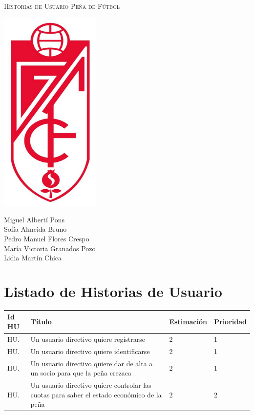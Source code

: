 \documentclass[11pt]{article}
\begin{document}
\begin{titlepage}
\centering
\vspace{4.5cm}
{\scshape\LARGE Historias de Usuario Peña de Fútbol\par}
\vspace{1.5cm}

\includegraphics[width=5cm]{escudoGR}

\vspace{3cm}
{\scshape\large \par}
\vspace{1cm}

{Miguel Albertí Pons\\
Sofía Almeida Bruno\\
Pedro Manuel Flores Crespo\\
María Victoria Granados Pozo\\
Lidia Martín Chica
\par}

\end{titlepage}
\newpage

\section{Listado de Historias de Usuario}
\begin{table}[H]
  \centering
  \begin{tabular}{p{0.1\linewidth}p{0.7\linewidth}p{0.15\linewidth}p{0.15\linewidth}}
    \toprule
    \textbf{Id HU} & \textbf{Título} & \textbf{Estimación} & \textbf{Prioridad}\\
    \midrule
    HU. & Un usuario directivo quiere registrarse & 2 & 1\\
    HU. & Un usuario directivo quiere identificarse & 2 & 1\\
    HU. & Un usuario directivo quiere dar de alta a un socio para que la peña crezaca & 2 & 1\\
    HU. & Un usuario directivo quiere controlar las cuotas para saber el estado económico de la peña & 2 & 2\\
    \bottomrule
  \end{tabular}
\end{table}
\end{document}
